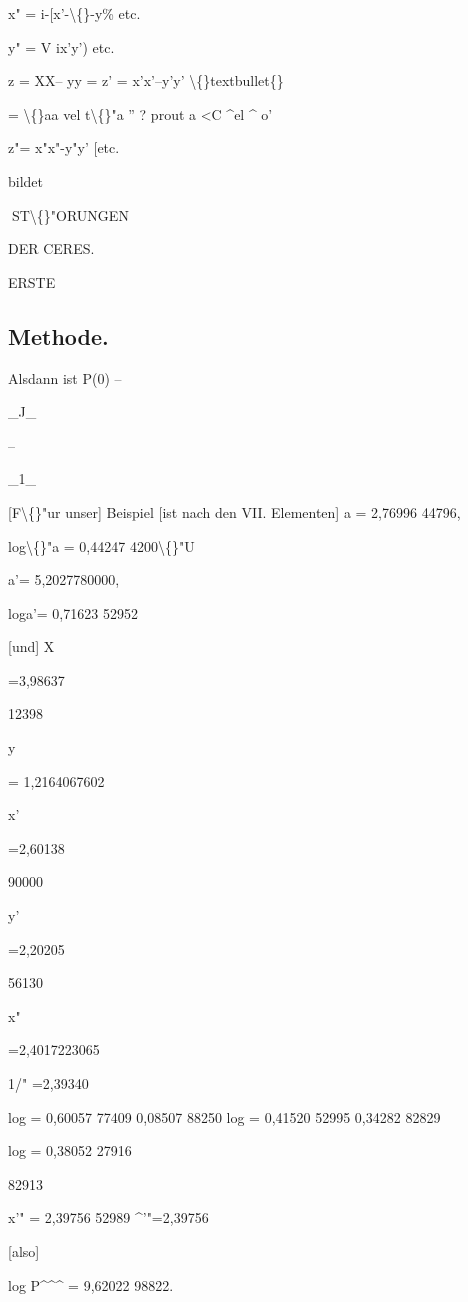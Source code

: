 \documentclass[10pt,a4paper]{article}
\begin{document}
x" = i-[x'-\textbackslash\{\}-y\%
etc.

y" = V ix'y')
etc.

z = XX-- yy =
z' = x'x'--y'y' \textbackslash\{\}textbullet\{\}

= \textbackslash\{\}aa vel t\textbackslash\{\}"a '' ? prout a <C \textasciicircum{}el \textasciicircum{} o'

z"= x"x"-y"y'
[etc.

bildet

\newpage
ST\textbackslash\{\}"ORUNGEN

DER CERES.

ERSTE

\subsection*{Methode.}


Alsdann ist
P(0) --

\_J\_

--

\_1\_

[F\textbackslash\{\}"ur unser] Beispiel [ist nach den VII. Elementen]
a = 2,76996 44796,

log\textbackslash\{\}"a = 0,44247 4200\textbackslash\{\}"U

a'= 5,2027780000,

loga'= 0,71623 52952

[und]
X

=3,98637

12398

y

= 1,2164067602

x'

=2,60138

90000

y'

=2,20205

56130

x"

=2,4017223065

1/" =2,39340

log = 0,60057 77409
0,08507 88250
log = 0,41520 52995
0,34282 82829

log = 0,38052 27916

82913

x'" = 2,39756 52989
\textasciicircum{}'"=2,39756

[also]

log P\textasciicircum{}\textasciicircum{}\textasciicircum{} = 9,62022 98822.
\end{document}
